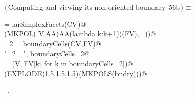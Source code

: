 \documentclass[11pt,oneside]{article}    %
\begin{document}
\begin{flushleft} \small \label{scrap102}
\protect{}$\langle\,$Computing and viewing its non-oriented boundary\nobreak\ {\footnotesize 56b}$\,\rangle\equiv$
\vspace{-1ex}
\begin{list}{}{} \item
\mbox{}\verb@FV = larSimplexFacets(CV)@\\
\mbox{}\verb@VIEW(MKPOL([V,AA(AA(lambda k:k+1))(FV),[]]))@\\
\mbox{}\verb@boundaryCells_2 = boundaryCells(CV,FV)@\\
\mbox{}\verb@print "\nboundaryCells_2 =\n", boundaryCells_2@\\
\mbox{}\verb@bndry = (V,[FV[k] for k in boundaryCells_2])@\\
\mbox{}\verb@VIEW(EXPLODE(1.5,1.5,1.5)(MKPOLS(bndry)))@\\
\mbox{}\verb@@{\NWsep}
\end{list}
\vspace{-1ex}
\footnotesize\addtolength{\baselineskip}{-1ex}
\begin{list}{}{\setlength{\itemsep}{-\parsep}\setlength{\itemindent}{-\leftmargin}}
\item \NWtxtMacroRefIn\ .
\end{list}
\end{flushleft}
\end{document}

